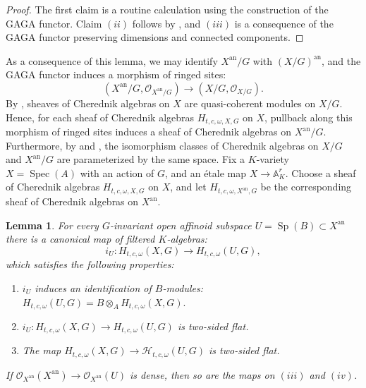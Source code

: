 \documentclass{amsart}
\newtheorem{Lemma}[defi]{Lemma}
\newcommand{\Sp}{\operatorname{Sp}}
\newcommand{\OX}{\mathcal{O}}
\newcommand{\Spec}{\operatorname{Spec}}
\begin{document}
\begin{proof}
The first claim is a routine calculation using the construction of the GAGA functor. Claim $(ii)$ follows by \cite[Example 1.8.(b)]{grosse2004rham}, and $(iii)$ is a consequence of the GAGA functor preserving dimensions and connected components.   
\end{proof}
As a consequence of this lemma, we may identify $X^{\operatorname{an}}/G$ with $(X/G)^{\operatorname{an}}$, and the GAGA functor induces a morphism of ringed sites:
\begin{equation*}
    (X^{\operatorname{an}}/G,\OX_{X^{\operatorname{an}}/G})\rightarrow (X/G,\OX_{X/G}).
\end{equation*}
By \cite[Section 2.13]{etingof2004cherednik}, sheaves of Cherednik algebras on $X$ are quasi-coherent modules on $X/G$. Hence, for each sheaf of Cherednik algebras $H_{t,c,\omega,X,G}$ on $X$, pullback along this morphism of ringed sites induces a sheaf of Cherednik algebras on $X^{\operatorname{an}}/G$.
Furthermore, by \cite[Section 2.13]{etingof2004cherednik} and \cite[Theorem B]{p-adicCheralg}, the isomorphism classes of Cherednik algebras on $X/G$ and $X^{\operatorname{an}}/G$ are parameterized by the same space. Fix a $K$-variety $X=\Spec(A)$ with an action of $G$, and  an étale map $X\rightarrow \mathbb{A}^r_K$. Choose a sheaf of Cherednik algebras $H_{t,c,\omega,X,G}$ on $X$, and let $H_{t,c,\omega,X^{\operatorname{an}},G}$ be the corresponding sheaf of Cherednik algebras on $X^{\operatorname{an}}$.
\begin{Lemma}\label{Lemma construction of the map to GAGA extension}
For every $G$-invariant open affinoid subspace $U=\Sp(B)\subset X^{\operatorname{an}}$ there is a canonical map of filtered $K$-algebras:
\begin{equation*}
    i_U:H_{t,c,\omega}(X,G)\rightarrow H_{t,c,\omega}(U,G),
\end{equation*}
which satisfies the following properties:
\begin{enumerate}[label=(\roman*)]
    \item $i_U$ induces an identification of $B$-modules: $H_{t,c,\omega}(U,G)=B\otimes_AH_{t,c,\omega}(X,G).$
    \item $i_U:H_{t,c,\omega}(X,G)\rightarrow H_{t,c,\omega}(U,G)$ is two-sided flat.
    \item The map $H_{t,c,\omega}(X,G)\rightarrow \mathcal{H}_{t,c,\omega}(U,G)$ is two-sided flat.
\end{enumerate}
If $\OX_{X^{\operatorname{an}}}(X^{\operatorname{an}})\rightarrow \OX_{X^{\operatorname{an}}}(U)$ is dense, then so are the maps on $(iii)$ and $(iv)$.
\end{Lemma}
\end{document}
